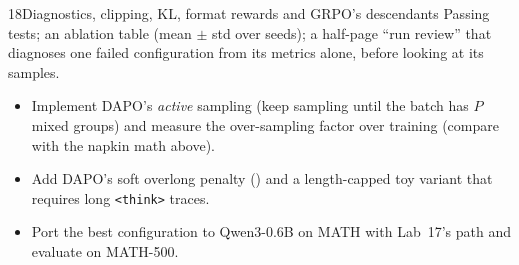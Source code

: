 \begin{labbox}{18}{Diagnostics, clipping, KL, format rewards and GRPO's descendants}
Passing tests; an ablation table (mean $\pm$ std over seeds); a half-page ``run review'' that
diagnoses one failed configuration from its metrics alone, before looking at its samples.

\begin{itemize}
\item Implement DAPO's \emph{active} sampling (keep sampling until the batch has $P$ mixed groups)
and measure the over-sampling factor over training (compare with the napkin math above).
\item Add DAPO's soft overlong penalty () and a
length-capped toy variant that requires long \verb|<think>| traces.
\item Port the best configuration to Qwen3-0.6B on MATH with Lab~17's 
path and evaluate on MATH-500.
\end{itemize}
\end{labbox}
